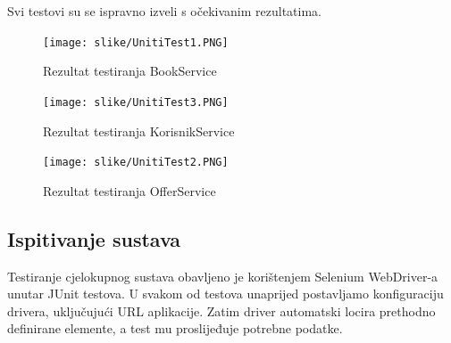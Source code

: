             Svi testovi su se ispravno izveli s očekivanim rezultatima. 
          
			
			
			\begin{figure}[H]
				\texttt{[image: slike/UnitiTest1.PNG]} %
				\centering
				\caption{Rezultat testiranja BookService }
				\label{fig:BookService1}
			\end{figure}
			
			
			
			\begin{figure}[H]
				\texttt{[image: slike/UnitiTest3.PNG]} %
				\centering
				\caption{Rezultat testiranja KorisnikService }
				\label{fig:KorisnikService1}
			\end{figure}
			
			
			
			\begin{figure}[H]
				\texttt{[image: slike/UnitiTest2.PNG]} %
				\centering
				\caption{Rezultat testiranja OfferService}
				\label{fig:OfferService1}
			\end{figure}
			
			\eject
			
			
			
			
			
			\subsection{Ispitivanje sustava}
			
			 Testiranje cjelokupnog sustava obavljeno je korištenjem Selenium WebDriver-a unutar JUnit testova. U svakom od testova unaprijed postavljamo konfiguraciju drivera, uključujući URL aplikacije. Zatim driver automatski locira prethodno definirane elemente, a test mu proslijeđuje potrebne podatke.
    
